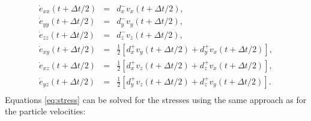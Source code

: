 \documentclass[11pt]{article}
\begin{document}
\begin{eqnarray}
  \dot{e}_{xx}(t+\Delta t/2) & = & d^-_x v_x(t+\Delta t/2), \nonumber\\
  \dot{e}_{yy}(t+\Delta t/2) & = & d^-_y v_y(t+\Delta t/2), \nonumber\\
  \dot{e}_{zz}(t+\Delta t/2) & = & d^-_z v_z(t+\Delta t/2), \nonumber\\
  \dot{e}_{xy}(t+\Delta t/2) & = & \frac{1}{2}\left[d^+_x v_y(t+\Delta t/2) 
                                 + d^+_y v_x(t+\Delta t/2)\right],\nonumber \\
    \dot{e}_{xz}(t+\Delta t/2) & = & \frac{1}{2}\left[d^+_x v_z(t+\Delta t/2) 
                                 + d^+_z v_x(t+\Delta t/2)\right],\nonumber \\
    \dot{e}_{yz}(t+\Delta t/2) & = & \frac{1}{2}\left[d^+_y v_z(t+\Delta t/2) 
                                 +d^+_z v_y(t+\Delta t/2)\right]. \nonumber\\
\end{eqnarray}
%
Equations \eqref{eq:stress}   can be solved for the stresses using the 
same approach as for the particle velocities:
\end{document}
